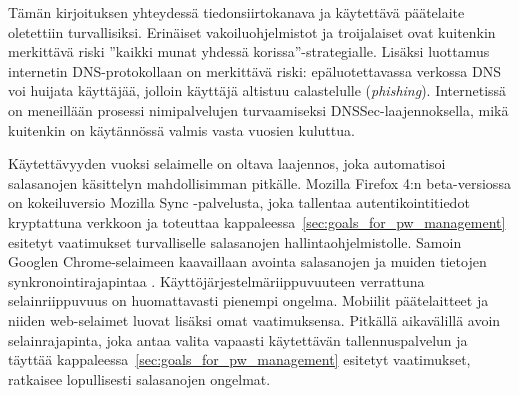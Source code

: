 \documentclass[english,gradu]{tktltiki}
\begin{document}
Tämän kirjoituksen yhteydessä tiedonsiirtokanava ja käytettävä päätelaite oletettiin turvallisiksi. Erinäiset vakoiluohjelmistot ja troijalaiset ovat kuitenkin merkittävä riski ''kaikki munat yhdessä korissa''-strategialle. Lisäksi luottamus internetin DNS-protokollaan on merkittävä riski: epäluotettavassa verkossa DNS voi huijata käyttäjää, jolloin käyttäjä altistuu calastelulle (\emph{phishing}).
Internetissä on meneillään prosessi nimipalvelujen turvaamiseksi DNSSec-laajennoksella, mikä kuitenkin on käytännössä valmis vasta vuosien kuluttua.

Käytettävyyden vuoksi selaimelle on oltava laajennos, joka automatisoi salasanojen käsittelyn mahdollisimman
pitkälle. Mozilla Firefox 4:n beta-versiossa on kokeiluversio Mozilla Sync -palvelusta, joka tallentaa
autentikointitiedot kryptattuna verkkoon ja toteuttaa kappaleessa~\ref{sec:goals_for_pw_management} esitetyt
vaatimukset turvalliselle salasanojen hallintaohjelmistolle. Samoin Googlen Chrome-selaimeen kaavaillaan avointa
salasanojen ja muiden tietojen synkronointirajapintaa \cite{chromium_sync_09}. Käyttöjärjestelmäriippuvuuteen
verrattuna selainriippuvuus on huomattavasti pienempi ongelma. Mobiilit päätelaitteet ja niiden web-selaimet
luovat lisäksi omat vaatimuksensa. Pitkällä aikavälillä avoin selainrajapinta, joka antaa valita vapaasti käytettävän tallennuspalvelun ja täyttää kappaleessa~\ref{sec:goals_for_pw_management} esitetyt vaatimukset, ratkaisee lopullisesti salasanojen ongelmat.








\lastpage
\end{document}
